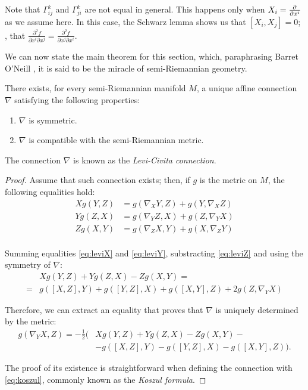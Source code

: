 Note that $\Gamma^k_{ij}$ and $\Gamma^k_{ji}$ are not equal in general. This happens only when $X_i = \frac{\partial^{} }{\partial x^i}$ as we assume here. In this case, the Schwarz lemma shows us that $[X_i, X_j] = 0$; \ie, that $\frac{\partial^2 f}{\partial x^i \partial x^j} = \frac{\partial^2 f}{\partial x^j \partial x^i}$.

We can now state the main theorem for this section, which, paraphrasing Barret O'Neill \cite[p. 60]{oneill83}, it is said to be the miracle of semi-Riemannian geometry.

\begin{theorem}
	\label{theo:levicivita}
	There exists, for every semi-Riemannian manifold $M$, a unique affine connection $\nabla$ satisfying the following properties:
	\begin{enumerate}
		\item $\nabla$ is symmetric.
		\item $\nabla$ is compatible with the semi-Riemannian metric.
	\end{enumerate}

	The connection $\nabla$ is known as the \emph{Levi-Civita connection}.
\end{theorem}

\begin{proof}
	Assume that such  connection exists; then, if $g$ is the metric on $M$, the following equalities hold:
	\begin{align}
		\label{eq:leviX}
		X g(Y,Z) &= g(\nabla_X Y, Z) + g(Y, \nabla_X Z) \\
		\label{eq:leviY}
		Y g(Z,X) &= g(\nabla_Y Z, X) + g(Z, \nabla_Y X) \\
		\label{eq:leviZ}
		Z g(X,Y) &= g(\nabla_Z X, Y) + g(X, \nabla_Z Y) \\
	\end{align}

	Summing equalities \ref{eq:leviX} and \ref{eq:leviY}, substracting \ref{eq:leviZ} and using the symmetry of $\nabla$:
	\begin{align*}
		&X g(Y,Z) + Y g(Z,X) - Z g(X,Y) = \\
		= &g([X,Z], Y) + g([Y,Z], X) + g([X,Y], Z) + 2g(Z, \nabla_Y X)
	\end{align*}

	Therefore, we can extract an equality that proves that $\nabla$ is uniquely determined by the metric:
	\begin{align}
		\label{eq:koszul}
		g(\nabla_Y X, Z) = -\frac{1}{2} \big(&X g(Y,Z) + Y g(Z,X) - Zg(X,Y) - \\
		\nonumber
		&- g([X,Z], Y) - g([Y,Z], X) - g([X,Y],Z) \big).
	\end{align}

	The proof of its existence is straightforward when defining the connection with \autoref{eq:koszul}, commonly known as the \emph{Koszul formula}.
\end{proof}


